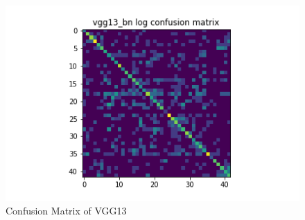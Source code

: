 \begin{figure}[H]
\begin{minipage}[b]{.5\linewidth}
  \end{minipage}
  \hfill
  \begin{minipage}[b]{.5\linewidth}
    \centering
    \includegraphics[width=1.2\textwidth]{figs/conf_matrix/vgg13_bn_log_conf.png}
  \end{minipage}

  \caption{Confusion Matrix of VGG13}
  \vspace{-3mm}
  \label{fig:vgg13_conf}
\end{figure}

